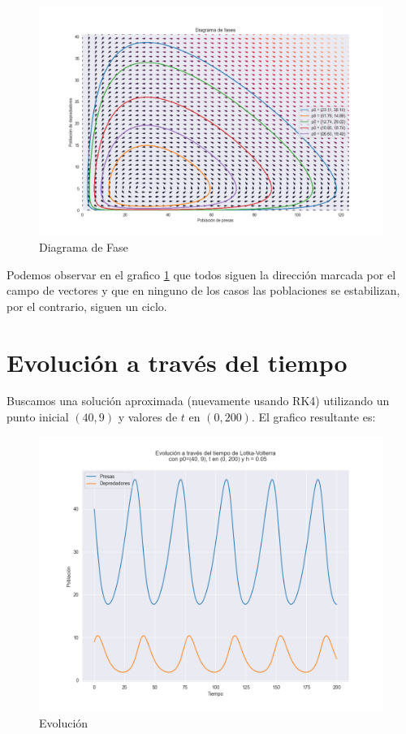 \documentclass [a4paper,12pt,oneside,final]{article}
\begin{document}
\begin{figure}[H]
    \centering
    \includegraphics[width=15cm,keepaspectratio]{./diagramas/fases.png}
    \caption{Diagrama de Fase}\label{fig:fase}
\end{figure}

Podemos observar en el grafico \ref{fig:fase} que todos siguen la dirección marcada por el campo de vectores y que en ninguno de los casos las poblaciones se estabilizan, por el contrario, siguen un ciclo.


\section{Evolución a través del tiempo}

Buscamos una solución aproximada (nuevamente usando RK4) utilizando un punto inicial $(40, 9)$ y valores de $t$ en $(0, 200)$. El grafico resultante es:

\begin{figure}[H]
    \centering
    \includegraphics[width=15cm,keepaspectratio]{./diagramas/evolucion.png}
    \caption{Evolución}\label{fig:time}
\end{figure}
\end{document}

